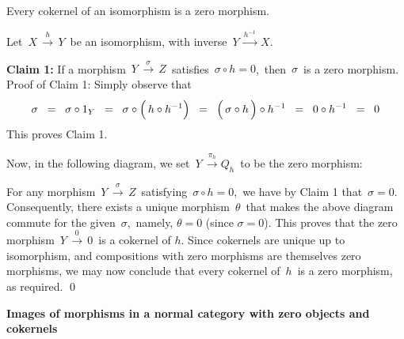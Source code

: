 
\vskip 0.5cm
\begin{lemma}\label{CokernelOfAnIsomorphismIsZero}
\mbox{}
\vskip 0.1cm
\noindent
Every cokernel of an isomorphism is a zero morphism.
\end{lemma}
\proof
Let
\,$X \,\overset{h}{\longrightarrow}\, Y$\,
be an isomorphism, with inverse
\,$Y \,\overset{h^{-1}}{\longrightarrow}\, X$.\,

\vskip 0.4cm
\noindent
\textbf{Claim 1:}\quad
If a morphism \,$Y \,\overset{\sigma}{\longrightarrow}\, Z$\, satisfies \,$\sigma \circ h = 0$,\,
then \,$\sigma$\, is a zero morphism.
\vskip 0.2cm
\noindent
Proof of Claim 1:\;\;
Simply observe that
\begin{equation*}
\sigma
\;\; = \;\;
	\sigma \circ 1_{Y}
\;\; = \;\;
	\sigma \circ \left(\,h \overset{{\color{white}!}}{\circ} h^{-1}\right)
\;\; = \;\;
	 \left(\, \sigma \overset{{\color{white}!}}{\circ} h \,\right) \circ h^{-1}
\;\; = \;\;
	 0 \circ h^{-1}
\;\; = \;\;
	 0
\end{equation*}
This proves Claim 1.

\vskip 0.4cm
\noindent
Now, in the following diagram, we set
\,$Y \,\overset{\pi_{h}}{\longrightarrow} Q_{h}$\,
to be the zero morphism:
\begin{center}
\end{center}
For any morphism
\,$Y \,\overset{\sigma}{\longrightarrow}\, Z$\, satisfying \,$\sigma \circ h = 0$,\,
we have by Claim 1 that \,$\sigma = 0$.
Consequently, there exists a unique morphism \,$\theta$\, that makes the above diagram
commute for the given \,$\sigma$,\, namely, $\theta = 0$ (since $\sigma = 0$).
This proves that the zero morphism \,$Y \,\overset{0}{\longrightarrow}\, 0$\, is a cokernel of $h$.
Since cokernels are unique up to isomorphism, and compositions with zero morphisms are themselves zero morphisms,
we may now conclude that every cokernel of \,$h$\, is a zero morphism, as required.
\qed


\vskip 1.0cm
\noindent
\textbf{\large Images of morphisms in a normal category with zero objects and cokernels}

